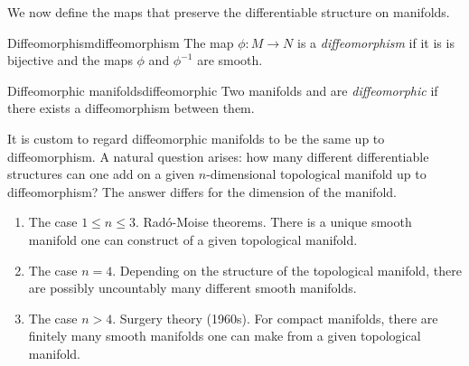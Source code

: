 We now define the maps that preserve the differentiable structure on manifolds.
\begin{definition}{Diffeomorphism}{diffeomorphism}
    The map \(\phi : M \to N\) is a \emph{diffeomorphism} if it is is bijective and the maps \(\phi\) and \(\phi^{-1}\) are smooth.
\end{definition}

\begin{definition}{Diffeomorphic manifolds}{diffeomorphic}
    Two manifolds  and  are \emph{diffeomorphic} if there exists a diffeomorphism between them.
\end{definition}

It is custom to regard diffeomorphic manifolds to be the same up to diffeomorphism. A natural question arises: how many different differentiable structures can one add on a given \(n\)-dimensional topological manifold up to diffeomorphism? The answer differs for the dimension of the manifold.
\begin{enumerate}[label=(\alph*)]
    \item The case \(1 \leq n \leq 3\). Radó-Moise theorems. There is a unique smooth manifold one can construct of a given topological manifold.
    \item The case \(n = 4\). Depending on the structure of the topological manifold, there are possibly uncountably many different smooth manifolds.
    \item The case \(n > 4\). Surgery theory (1960s). For compact manifolds, there are finitely many smooth manifolds one can make from a given topological manifold.
\end{enumerate}
